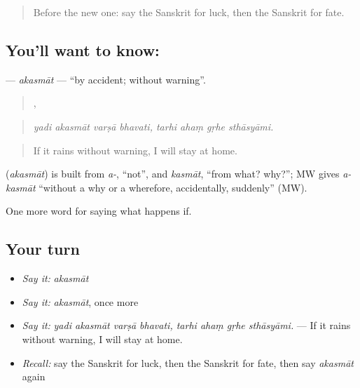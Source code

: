 \label{lesson:SA-C369-akasmat}



\begin{quote}
Before the new one: say the Sanskrit for luck, then the Sanskrit for fate.
\end{quote}

\subsection*{You'll want to know: }
\textbf{} — \emph{akasmāt} — \textquotedblleft{}by accident; without warning\textquotedblright{}.

\begin{quote}
   ,    
\end{quote}

\begin{quote}
\emph{yadi akasmāt varṣā bhavati, tarhi ahaṃ gṛhe sthāsyāmi.}
\end{quote}

\begin{quote}
If it rains without warning, I will stay at home.
\end{quote}

\begin{cousinweb}
\textbf{} (\emph{akasmāt}) is built from \emph{a-}, \textquotedblleft{}not\textquotedblright{}, and \emph{kasmāt}, \textquotedblleft{}from what? why?\textquotedblright{}; MW gives \emph{a-kasmāt} \textquotedblleft{}without a why or a wherefore, accidentally, suddenly\textquotedblright{} (MW).
\end{cousinweb}

\begin{grammarlens}[title={What you've built}]
One more word for saying what happens if.
\end{grammarlens}

\subsection*{Your turn}
\begin{itemize}
\raggedright
  \item \emph{Say it:} \emph{akasmāt}
  \item \emph{Say it:} \emph{akasmāt}, once more
  \item \emph{Say it:} \emph{yadi akasmāt varṣā bhavati, tarhi ahaṃ gṛhe sthāsyāmi.} — If it rains without warning, I will stay at home.
  \item \emph{Recall:} say the Sanskrit for luck, then the Sanskrit for fate, then say \emph{akasmāt} again
\end{itemize}


